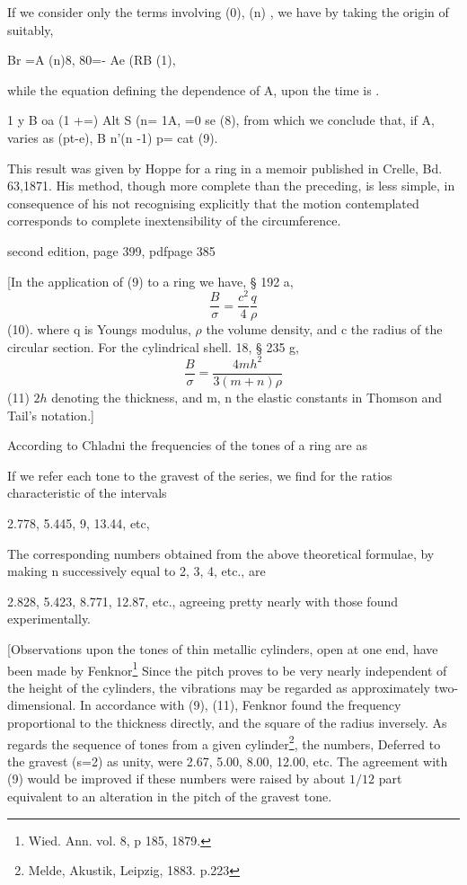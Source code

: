 If we consider only the terms involving (0), (n) , we have by taking the
origin of suitably,

Br =A (n)8, 80=- Ae (RB (1),

while the equation defining the dependence of A, upon the time is .

1 y B oa (1 +=) Alt S (n= 1A, =0 se (8), from which we conclude that, if
A, varies as (pt-e), B n'(n -1) p= cat (9).

This result was given by Hoppe for a ring in a memoir published in
Crelle, Bd. 63,1871. His method, though more complete than the
preceding, is less simple, in consequence of his not recognising
explicitly that the motion contemplated corresponds to complete
inextensibility of the circumference.

second edition, page 399, pdfpage 385

[In the application of (9) to a ring we have, § 192 a,
\[ \frac{B}{\sigma}= \frac{c^2}{4} \frac{q}{\rho}\]
(10).  where q is Youngs modulus, \(\rho\) the volume density, and c the
radius of the circular section. For the cylindrical shell.
18, § 235 g,
\[ \frac{B}{\sigma}= \frac{4 m h^2}{3(m+n)\rho}\]
(11)
\(2h\) denoting the thickness, and m, n the elastic constants in
Thomson and Tail’s notation.]

According to Chladni the frequencies of the tones of a ring are as

If we refer each tone to the gravest of the series, we find for the
ratios characteristic of the intervals

2.778, 5.445, 9, 13.44, etc,

The corresponding numbers obtained from the above theoretical formulae,
by making n successively equal to 2, 3, 4, etc., are

2.828, 5.423, 8.771, 12.87, etc.,
agreeing pretty nearly with those found experimentally.

[Observations upon the tones of thin metallic cylinders, open
at one end, have been made by Fenknor\footnote{Wied. Ann. vol. 8, p 185, 1879.}
Since the pitch proves to be very nearly independent of the height of the
cylinders, the vibrations may be regarded as approximately two-dimensional.  In
accordance with (9), (11), Fenknor found the frequency proportional to the
thickness directly, and the square of the radius inversely. As regards the
sequence of tones from a given cylinder\footnote{Melde, Akustik, Leipzig, 1883.
p.223 }, the numbers, Deferred to the gravest (s=2) as unity,
were 2.67, 5.00, 8.00, 12.00, etc. The agreement with (9) would
be improved if these numbers were raised by about \(1/12\) part
equivalent to an alteration in the pitch of the gravest tone.

